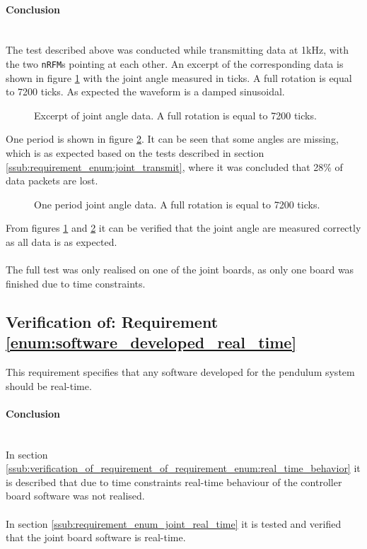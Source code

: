 \paragraph{Conclusion}~\\
The test described above was conducted while transmitting data at 1kHz, with the two \texttt{nRFM}s pointing at each other.
An excerpt of the corresponding data is shown in figure \ref{fig:joint_angle_measured_full} with the joint angle measured in ticks.
A full rotation is equal to 7200 ticks.
As expected the waveform is a damped sinusoidal.
\begin{figure}[h]
	\centering
	\caption[Excerpt of joint angle data]{Excerpt of joint angle data. A full rotation is equal to 7200 ticks.}
	\label{fig:joint_angle_measured_full}
\end{figure}
One period is shown in figure \ref{fig:joint_angle_measured_zoom}.
It can be seen that some angles are missing, which is as expected based on the tests described in section \ref{ssub:requirement_enum:joint_transmit}, where it was concluded that 28\% of data packets are lost.
\begin{figure}[h]
	\centering
	\caption[One period joint angle data]{One period joint angle data. A full rotation is equal to 7200 ticks.}
	\label{fig:joint_angle_measured_zoom}
\end{figure}
From figures \ref{fig:joint_angle_measured_full} and \ref{fig:joint_angle_measured_zoom} it can be verified that the joint angle are measured correctly as all data is as expected.
\\~\\
The full test was only realised on one of the joint boards, as only one board was finished due to time constraints.


\subsection{Verification of: Requirement \ref{enum:software_developed_real_time}} %
\label{sub:verification_of_requirement_enum:software_developed_real_time}
This requirement specifies that any software developed for the pendulum system should be real-time.

\paragraph{Conclusion}~\\
In section \ref{ssub:verification_of_requirement_of_requirement_enum:real_time_behavior} it is described that due to time constraints real-time behaviour of the controller board software was not realised.
\\~\\
In section \ref{ssub:requirement_enum_joint_real_time} it is tested and verified that the joint board software is real-time.


